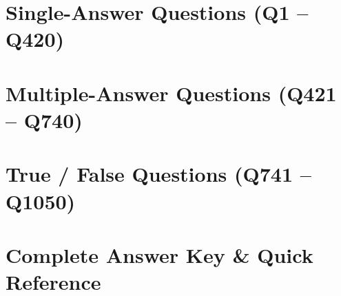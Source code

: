 \documentclass[10pt,a4paper]{article}
\begin{document}
\tableofcontents
\clearpage



\part{Single-Answer Questions (Q1 -- Q420)}

\clearpage

\part{Multiple-Answer Questions (Q421 -- Q740)}

\clearpage

\part{True / False Questions (Q741 -- Q1050)}

\clearpage

\part{Complete Answer Key \& Quick Reference}

\end{document}
